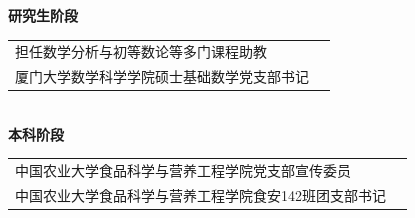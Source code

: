 
\textbf{研究生阶段}\\[2ex]

\begin{tabularx}{\textwidth}{@{}Xr@{}}
担任数学分析与初等数论等多门课程助教\\[0.6ex]

厦门大学数学科学学院硕士基础数学党支部书记 \\


\end{tabularx}\\[2ex]

\textbf{本科阶段}\\[2ex]

\begin{tabularx}{\textwidth}{@{}Xr@{}}

中国农业大学食品科学与营养工程学院党支部宣传委员 \\[0.6ex]

中国农业大学食品科学与营养工程学院食安142班团支部书记\\

\end{tabularx}

